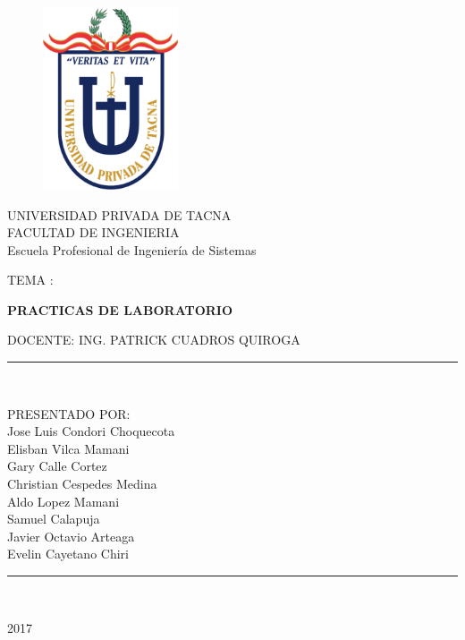 \documentclass[a4paper,openright,12pt]{book}
\begin{document}
\begin{titlepage}
\begin{center}
\begin{figure}[htb]
\begin{center}
\includegraphics[width=4cm]{./images/upt}
\end{center}
\end{figure}

UNIVERSIDAD PRIVADA DE TACNA\\
\vspace*{0.10in}
FACULTAD DE INGENIERIA\\
Escuela Profesional de Ingeniería de Sistemas\\
\vspace*{0.2in}
\begin{large}
TEMA : \\
\end{large}
\vspace*{0.2in}
\begin{Large}
\textbf{PRACTICAS DE LABORATORIO} \\
\end{Large}
\vspace*{0.3in}
\begin{large}
DOCENTE: ING. PATRICK CUADROS QUIROGA\\
\end{large}
\vspace*{0.3in}
\rule{80mm}{0.1mm}\\
\vspace*{0.1in}
\begin{large}
PRESENTADO POR: \\
Jose Luis Condori Choquecota \\
Elisban Vilca Mamani\\
Gary Calle Cortez\\
Christian Cespedes Medina\\
Aldo Lopez Mamani\\
Samuel Calapuja\\
Javier Octavio Arteaga\\
Evelin Cayetano Chiri\\

\end{large}
\rule{80mm}{0.1mm}\\
\begin{large}
2017\\
\end{large}
\end{center}
\end{titlepage}
\end{document}
